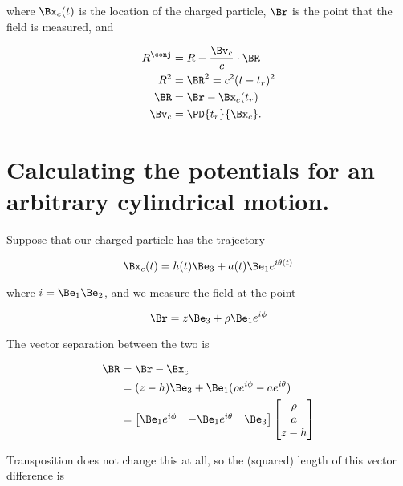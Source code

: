 where $\Bx_c(t)$ is the location of the charged particle, $\Br$ is the point that the field is measured, and 

\begin{align}\label{eqn:matrixVectorPotentials:30}
R^\conj &= R - \frac{\Bv_c}{c} \cdot \BR \\
R^2 &= \BR^2 = c^2( t - t_r)^2 \\
\BR &= \Br - \Bx_c(t_r) \\
\Bv_c &= \PD{t_r}{\Bx_c}.
\end{align}

\section{Calculating the potentials for an arbitrary cylindrical motion.}

Suppose that our charged particle has the trajectory

\begin{equation}\label{eqn:matrixVectorPotentials:50}
\Bx_c(t) = h(t) \Be_3 + a(t) \Be_1 e^{i \theta(t)}
\end{equation}

where $i = \Be_1 \Be_2$, and we measure the field at the point

\begin{equation}\label{eqn:matrixVectorPotentials:70}
\Br = z \Be_3 + \rho \Be_1 e^{i \phi}
\end{equation}

The vector separation between the two is

\begin{align*}
\BR 
&= \Br - \Bx_c \\
&= (z - h) \Be_3 + \Be_1 ( \rho e^{i\phi} - a e^{i\theta} ) \\
&=
\begin{bmatrix}
\Be_1 e^{i\phi} & - \Be_1 e^{i\theta} & \Be_3
\end{bmatrix}
\begin{bmatrix}
\rho \\
a \\
z - h
\end{bmatrix}
\end{align*}

Transposition does not change this at all, so the (squared) length of this vector difference is


